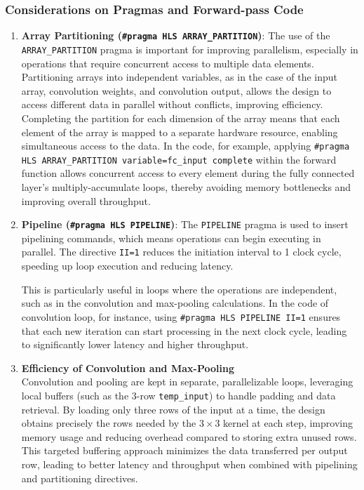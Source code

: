 \documentclass{article}
\begin{document}
\subsubsection{Considerations on Pragmas and Forward-pass Code}

\begin{enumerate}
    \item \textbf{Array Partitioning (\texttt{\#pragma HLS ARRAY\_PARTITION})}:  
    The use of the \texttt{ARRAY\_PARTITION} pragma is important for improving parallelism, especially in operations that require concurrent access to multiple data elements. Partitioning arrays into independent variables, as in the case of the input array, convolution weights, and convolution output, allows the design to access different data in parallel without conflicts, improving efficiency. Completing the partition for each dimension of the array means that each element of the array is mapped to a separate hardware resource, enabling simultaneous access to the data. In the code, for example, applying \texttt{\#pragma HLS ARRAY\_PARTITION variable=fc\_input complete} within the forward function
    allows concurrent access to every element during the fully connected layer’s multiply-accumulate loops, thereby avoiding memory
    bottlenecks and improving overall throughput.

    \item \textbf{Pipeline (\texttt{\#pragma HLS PIPELINE})}:  
    The \texttt{PIPELINE} pragma is used to insert pipelining commands, which means operations can begin executing in parallel. The directive \texttt{II=1} reduces the initiation interval to 1 clock cycle, speeding up loop execution and reducing latency.

    This is particularly useful in loops where the operations are independent, such as in the convolution and max-pooling calculations. In the code of convolution loop, for instance, using \texttt{\#pragma HLS PIPELINE II=1} ensures that each new iteration can start
    processing in the next clock cycle, leading to significantly lower latency and higher throughput.


    \item \textbf{Efficiency of Convolution and Max-Pooling}\\
    Convolution and pooling are kept in separate, parallelizable loops, leveraging local buffers (such as the 3-row \texttt{temp\_input}) to handle padding and data retrieval. By loading only three rows of the input at a time, the design obtains precisely the rows needed by the $3 \times 3$ kernel at each step, improving memory usage and reducing overhead compared to storing extra unused rows. This targeted buffering approach minimizes the data transferred per output row, leading to better latency and throughput when combined with pipelining and partitioning directives.



\end{enumerate}
\end{document}
